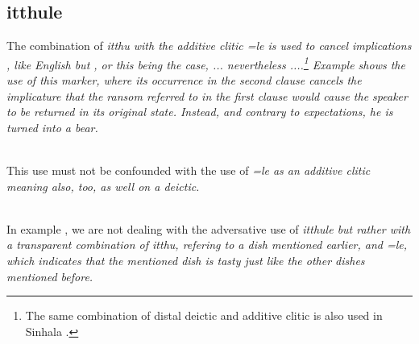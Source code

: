  
\subsection{itthule}\label{sec:wofo:itthule}

The combination of \em itthu \em with the additive clitic \em =le \em is used to cancel implications , like English \em but \em, or \em this being the case, ... nevertheless ...\em.\footnote{The same combination of distal deictic and additive clitic is also used in Sinhala \citep[55]{Jayawardena2004}.} Example  shows the use of this marker, where its occurrence in the second clause cancels the implicature that the ransom referred to in the first clause would cause the speaker to be returned in its original state. Instead, and contrary to expectations,  he is turned into a bear.
 
\\

This use must not be confounded with the use of \em =le \em as an additive clitic meaning \em also, too, as well \em on a deictic.


 \\
In example , we are not dealing with the adversative use of \em itthule \em but rather with a transparent combination of \em itthu\em, refering to a dish mentioned earlier, and \em =le\em, which indicates that the mentioned dish is tasty just like the other dishes mentioned before.
